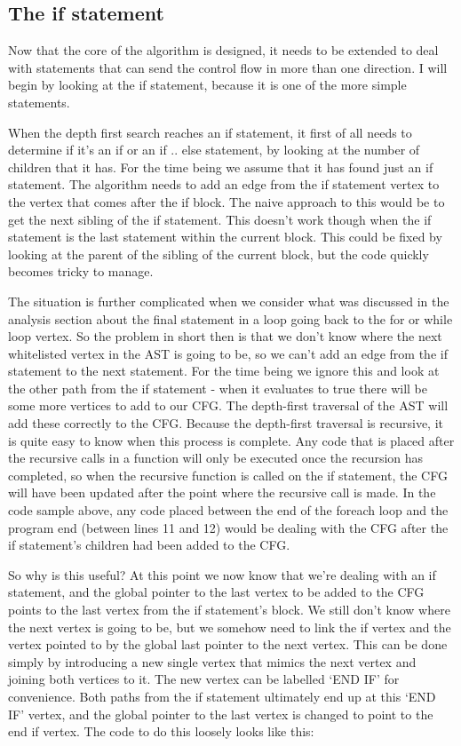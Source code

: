 \subsection{The if statement}

Now that the core of the algorithm is designed, it needs to be extended to deal with statements that can send the control flow in more than one direction. I will begin by looking at the if statement, because it is one of the more simple statements.

When the depth first search reaches an if statement, it first of all needs to determine if it's an if or an if .. else statement, by looking at the number of children that it has. For the time being we assume that it has found just an if statement. The algorithm needs to add an edge from the if statement vertex to the vertex that comes after the if block. The naive approach to this would be to get the next sibling of the if statement. This doesn't work though when the if statement is the last statement within the current block. This could be fixed by looking at the parent of the sibling of the current block, but the code quickly becomes tricky to manage.

The situation is further complicated when we consider what was discussed in the analysis section about the final statement in a loop going back to the for or while loop vertex. So the problem in short then is that we don't know where the next whitelisted vertex in the AST is going to be, so we can't add an edge from the if statement to the next statement. For the time being we ignore this and look at the other path from the if statement - when it evaluates to true there will be some more vertices to add to our CFG. The depth-first traversal of the AST will add these correctly to the CFG. Because the depth-first traversal is recursive, it is quite easy to know when this process is complete. Any code that is placed after the recursive calls in a function will only be executed once the recursion has completed, so when the recursive function is called on the if statement, the CFG will have been updated after the point where the recursive call is made. In the code sample above, any code placed between the end of the foreach loop and the program end (between lines 11 and 12) would be dealing with the CFG after the if statement's children had been added to the CFG.

So why is this useful? At this point we now know that we're dealing with an if statement, and the global pointer to the last vertex to be added to the CFG points to the last vertex from the if statement's block. We still don't know where the next vertex is going to be, but we somehow need to link the if vertex and the vertex pointed to by the global last pointer to the next vertex. This can be done simply by introducing a new single vertex that mimics the next vertex and joining both vertices to it. The new vertex can be labelled `END IF' for convenience. Both paths from the if statement ultimately end up at this `END IF' vertex, and the global pointer to the last vertex is changed to point to the end if vertex. The code to do this loosely looks like this:

